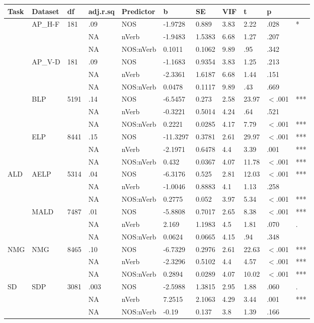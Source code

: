 \begin{table}[ht]
\centering
\begingroup\normalsize
\begin{tabular}{lllllllllll}
  \hline
Task & Dataset & df & adj.r.sq & Predictor & b & SE & VIF & t & p &  \\ 
  \hline
 & AP\_H-F & 181 & .09 & NOS & -1.9728 & 0.889 & 3.83 & 2.22 & .028 & * \\ 
   &  &  & NA & nVerb & -1.9483 & 1.5383 & 6.68 & 1.27 & .207 &   \\ 
   &  &  & NA & NOS:nVerb & 0.1011 & 0.1062 & 9.89 & .95 & .342 &   \\ 
   & AP\_V-D & 181 & .09 & NOS & -1.1683 & 0.9354 & 3.83 & 1.25 & .213 &   \\ 
   &  &  & NA & nVerb & -2.3361 & 1.6187 & 6.68 & 1.44 & .151 &   \\ 
   &  &  & NA & NOS:nVerb & 0.0478 & 0.1117 & 9.89 & .43 & .669 &   \\ 
   & BLP & 5191 & .14 & NOS & -6.5457 & 0.273 & 2.58 & 23.97 & $<$.001 & *** \\ 
   &  &  & NA & nVerb & -0.3221 & 0.5014 & 4.24 & .64 & .521 &   \\ 
   &  &  & NA & NOS:nVerb & 0.2221 & 0.0285 & 4.17 & 7.79 & $<$.001 & *** \\ 
   & ELP & 8441 & .15 & NOS & -11.3297 & 0.3781 & 2.61 & 29.97 & $<$.001 & *** \\ 
   &  &  & NA & nVerb & -2.1971 & 0.6478 & 4.4 & 3.39 & .001 & *** \\ 
   &  &  & NA & NOS:nVerb & 0.432 & 0.0367 & 4.07 & 11.78 & $<$.001 & *** \\ 
  ALD & AELP & 5314 & .04 & NOS & -6.3176 & 0.525 & 2.81 & 12.03 & $<$.001 & *** \\ 
   &  &  & NA & nVerb & -1.0046 & 0.8883 & 4.1 & 1.13 & .258 &   \\ 
   &  &  & NA & NOS:nVerb & 0.2775 & 0.052 & 3.97 & 5.34 & $<$.001 & *** \\ 
   & MALD & 7487 & .01 & NOS & -5.8808 & 0.7017 & 2.65 & 8.38 & $<$.001 & *** \\ 
   &  &  & NA & nVerb & 2.169 & 1.1983 & 4.5 & 1.81 & .070 & . \\ 
   &  &  & NA & NOS:nVerb & 0.0624 & 0.0665 & 4.15 & .94 & .348 &   \\ 
  NMG & NMG & 8465 & .10 & NOS & -6.7329 & 0.2976 & 2.61 & 22.63 & $<$.001 & *** \\ 
   &  &  & NA & nVerb & -2.3296 & 0.5102 & 4.4 & 4.57 & $<$.001 & *** \\ 
   &  &  & NA & NOS:nVerb & 0.2894 & 0.0289 & 4.07 & 10.02 & $<$.001 & *** \\ 
  SD & SDP & 3081 & .003 & NOS & -2.5988 & 1.3815 & 2.95 & 1.88 & .060 & . \\ 
   &  &  & NA & nVerb & 7.2515 & 2.1063 & 4.29 & 3.44 & .001 & *** \\ 
   &  &  & NA & NOS:nVerb & -0.19 & 0.137 & 3.8 & 1.39 & .166 &   \\ 
   \hline
\end{tabular}
\endgroup
\end{table}
